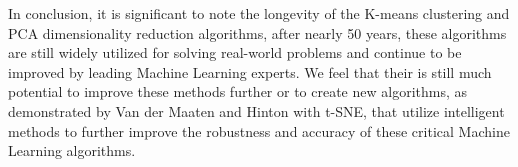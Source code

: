 \documentclass{article}
\begin{document}
In conclusion, it is significant to note the longevity of the K-means clustering and PCA dimensionality reduction algorithms, after nearly 50 years, these algorithms are still widely utilized for solving real-world problems and continue to be improved by leading Machine Learning experts. We feel that their is still much potential to improve these methods further or to create new algorithms, as demonstrated by Van der Maaten and Hinton with t-SNE, that utilize intelligent methods to further improve the robustness and accuracy of these critical Machine Learning algorithms.






\end{document}

